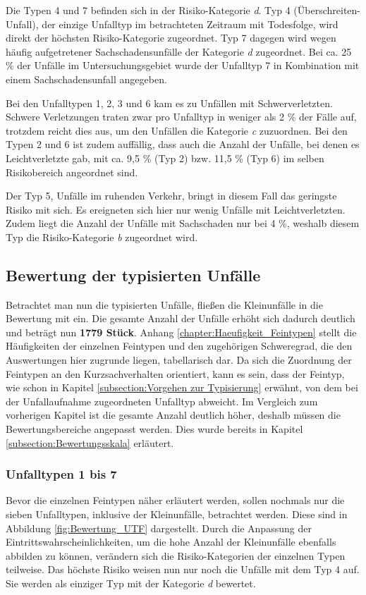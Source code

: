 Die Typen 4 und 7 befinden sich in der Risiko-Kategorie \textit{d}. Typ 4 (Überschreiten-Unfall), der einzige Unfalltyp im betrachteten Zeitraum mit Todesfolge, wird direkt der höchsten Risiko-Kategorie zugeordnet. Typ 7 dagegen wird wegen häufig aufgetretener Sachschadensunfälle der Kategorie \textit{d} zugeordnet. Bei ca. 25 \% der Unfälle im Untersuchungsgebiet wurde der Unfalltyp 7 in Kombination mit einem Sachschadensunfall angegeben.

Bei den Unfalltypen 1, 2, 3 und 6 kam es zu Unfällen mit Schwerverletzten. Schwere Verletzungen traten zwar pro Unfalltyp in weniger als 2 \% der Fälle auf, trotzdem reicht dies aus, um den Unfällen die Kategorie \textit{c} zuzuordnen. Bei den Typen 2 und 6 ist zudem auffällig, dass auch die Anzahl der Unfälle, bei denen es Leichtverletzte gab, mit ca. 9,5 \% (Typ 2) bzw. 11,5 \% (Typ 6) im selben Risikobereich angeordnet sind.

Der Typ 5, Unfälle im ruhenden Verkehr, bringt in diesem Fall das geringste Risiko mit sich. Es ereigneten sich hier nur wenig Unfälle mit Leichtverletzten. Zudem liegt die Anzahl der Unfälle mit Sachschaden nur bei 4 \%, weshalb diesem Typ die Risiko-Kategorie \textit{b} zugeordnet wird.

\subsection{Bewertung der typisierten Unfälle}\label{subsection:Bewertung der typisierten Unfälle}
Betrachtet man nun die typisierten Unfälle, fließen die Kleinunfälle in die Bewertung mit ein. Die gesamte Anzahl der Unfälle erhöht sich dadurch deutlich und beträgt nun \textbf{1779 Stück}. Anhang \ref{chapter:Haeufigkeit_Feintypen} stellt die Häufigkeiten der einzelnen Feintypen und den zugehörigen Schweregrad, die den Auswertungen hier zugrunde liegen, tabellarisch dar. Da sich die Zuordnung der Feintypen an den Kurzsachverhalten orientiert, kann es sein, dass der Feintyp, wie schon in Kapitel \ref{subsection:Vorgehen zur Typisierung} erwähnt, von dem bei der Unfallaufnahme zugeordneten Unfalltyp abweicht. Im Vergleich zum vorherigen Kapitel ist die gesamte Anzahl deutlich höher, deshalb müssen die Bewertungsbereiche angepasst werden. Dies wurde bereits in Kapitel \ref{subsection:Bewertungsskala} erläutert.

\subsubsection{Unfalltypen 1 bis 7}
Bevor die einzelnen Feintypen näher erläutert werden, sollen nochmals nur die sieben Unfalltypen, inklusive der Kleinunfälle, betrachtet werden. Diese sind in Abbildung \ref{fig:Bewertung_UTF} dargestellt. Durch die Anpassung der Eintrittswahrscheinlichkeiten, um die hohe Anzahl der Kleinunfälle ebenfalls abbilden zu können, verändern sich die Risiko-Kategorien der einzelnen Typen teilweise. Das höchste Risiko weisen nun nur noch die Unfälle mit dem Typ 4 auf. Sie werden als einziger Typ mit der Kategorie \textit{d} bewertet.

